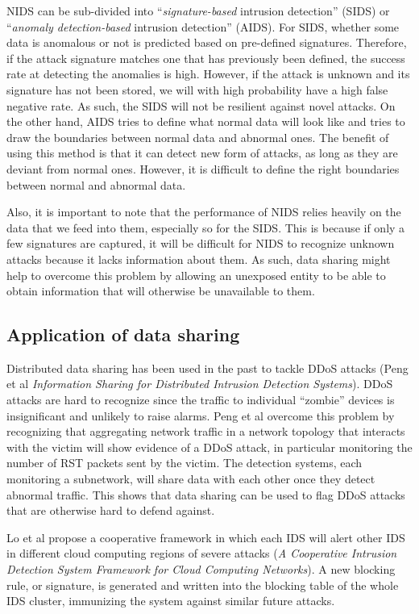 \begin{background}
NIDS can be sub-divided into ``\textit{signature-based} intrusion detection'' (SIDS) or ``\textit{anomaly detection-based} intrusion detection'' (AIDS). For SIDS, whether some data is anomalous or not is predicted based on pre-defined signatures. Therefore, if the attack signature matches one that has previously been defined, the success rate at detecting the anomalies is high. However, if the attack is unknown and its signature has not been stored, we will with high probability have a high false negative rate. As such, the SIDS will not be resilient against novel attacks. On the other hand, AIDS tries to define what normal data will look like and tries to draw the boundaries between normal data and abnormal ones. The benefit of using this method is that it can detect new form of attacks, as long as they are deviant from normal ones. However, it is difficult to define the right boundaries between normal and abnormal data.

Also, it is important to note that the performance of NIDS relies heavily on the data that we feed into them, especially so for the SIDS. This is because if only a few signatures are captured, it will be difficult for NIDS to recognize unknown attacks because it lacks information about them. As such, data sharing might help to overcome this problem by allowing an unexposed entity to be able to obtain information that will otherwise be unavailable to them.

\subsection{Application of data sharing}
Distributed data sharing has been used in the past to tackle DDoS attacks (Peng et al \textit{Information Sharing for Distributed Intrusion Detection Systems}). DDoS attacks are hard to recognize since the traffic to individual ``zombie'' devices is insignificant and unlikely to raise alarms. Peng et al overcome this problem by recognizing that aggregating network traffic in a network topology that interacts with the victim will show evidence of a DDoS attack, in particular monitoring the number of RST packets sent by the victim. The detection systems, each monitoring a subnetwork, will share data with each other once they detect abnormal traffic. This shows that data sharing can be used to flag DDoS attacks that are otherwise hard to defend against.

Lo et al propose a cooperative framework in which each IDS will alert other IDS in different cloud computing regions of severe attacks (\textit{A Cooperative Intrusion Detection System Framework for Cloud Computing Networks}). A new blocking rule, or signature, is generated and written into the blocking table of the whole IDS cluster, immunizing the system against similar future attacks.


\end{background}
